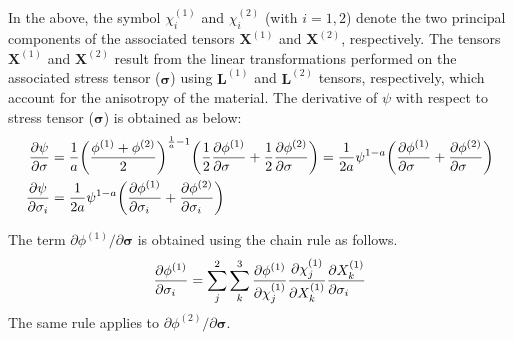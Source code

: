 \documentclass[12pt]{amsart}
\begin{document}
In the above, the symbol $\chi^{(1)}_i$ and $\chi^{(2)}_i$ (with $i=1,2$) denote the two principal components of the associated tensors $\mathbf{X}^{(1)}$ and $\mathbf{X}^{(2)}$, respectively.
The tensors $\mathbf{X}^{(1)}$ and $\mathbf{X}^{(2)}$ result from the linear transformations performed on the associated stress tensor ($\mathbf{\sigma}$) using $\mathbf{L}^{(1)}$ and $\mathbf{L}^{(2)}$ tensors, respectively, which account for the anisotropy of the material.
The derivative of $\psi$ with respect to stress tensor ($\mathbf{\sigma}$) is obtained as below:
\begin{equation}
  \label{eq:derivative1}
  \begin{split}
    \frac{\partial\psi}{\partial\mathbf{\sigma}}&=\frac{1}{a}\bigg(\frac{\phi^{(1)}+\phi^{(2)}}{2}\bigg)^{\frac{1}{a}-1}\bigg(\frac{1}{2}\frac{\partial\phi^{(1)}}{\partial\mathbf{\sigma}\hfill}+\frac{1}{2}\frac{\partial\phi^{(2)}}{\partial\mathbf{\sigma}\hfill}\bigg)=\frac{1}{2a}\psi^{1-a}\bigg(\frac{\partial\phi^{(1)}}{\partial\mathbf{\sigma}\hfill}+\frac{\partial\phi^{(2)}}{\partial\mathbf{\sigma}\hfill}\bigg)\\
    \frac{\partial\psi}{\partial\sigma_i}&=\frac{1}{2a}\psi^{1-a}\bigg(\frac{\partial\phi^{(1)}}{\partial\sigma_i\hfill}+\frac{\partial\phi^{(2)}}{\partial\sigma_i\hfill}\bigg)
  \end{split}
\end{equation}

The term $\partial\phi^{(1)}/\partial\mathbf{\sigma}$ is obtained using the chain rule as follows.
\begin{equation}
  \label{eq:derivative1_1}
  \frac{\partial\phi^{(1)}}{\partial\sigma_i\hfill}=\sum_j^2\sum_k^3 \frac{\partial\phi^{(1)}}{\partial\chi^{(1)}_j}  \frac{\partial\chi^{(1)}_j}{\partial X^{(1)}_k}   \frac{\partial X^{(1)}_k}{\partial\sigma_i\hfill}
\end{equation}
The same rule applies to $\partial\phi^{(2)}/\partial\mathbf{\sigma}$.
\end{document}

